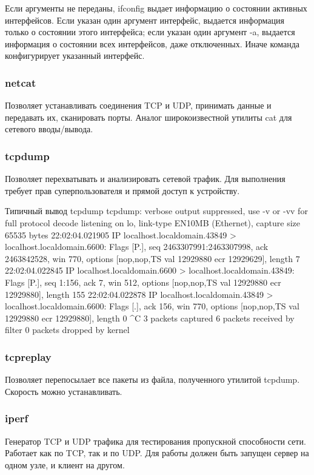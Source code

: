 Если аргументы не переданы, ifconfig выдает информацию о состоянии активных интерфейсов. Если указан один аргумент интерфейс, выдается информация только о состоянии этого интерфейса; если указан один аргумент -a, выдается информация о состоянии всех интерфейсов, даже отключенных. Иначе команда конфигурирует указанный интерфейс.

\subsubsection{netcat}
Позволяет устанавливать соединения TCP и UDP, принимать данные и передавать их, сканировать порты. Аналог широкоизвестной утилиты cat для сетевого вводы/вывода.

\subsubsection{tcpdump}
Позволяет перехватывать и анализировать сетевой трафик. Для выполнения требует прав суперпользователя и прямой доступ к устройству.

\begin{plainlst}{Типичный вывод tcpdump}{}
tcpdump: verbose output suppressed, use -v or -vv for full protocol decode
listening on lo, link-type EN10MB (Ethernet), capture size 65535 bytes
22:02:04.021905 IP localhost.localdomain.43849 > localhost.localdomain.6600: Flags [P.], seq 2463307991:2463307998, ack 2463842528, win 770, options [nop,nop,TS val 12929880 ecr 12929629], length 7
22:02:04.022845 IP localhost.localdomain.6600 > localhost.localdomain.43849: Flags [P.], seq 1:156, ack 7, win 512, options [nop,nop,TS val 12929880 ecr 12929880], length 155
22:02:04.022878 IP localhost.localdomain.43849 > localhost.localdomain.6600: Flags [.], ack 156, win 770, options [nop,nop,TS val 12929880 ecr 12929880], length 0
^C
3 packets captured
6 packets received by filter
0 packets dropped by kernel
\end{plainlst}

\subsubsection{tcpreplay}
Позволяет перепосылает все пакеты из файла, полученного утилитой tcpdump. Скорость можно устанавливать.

\subsubsection{iperf}
Генератор TCP и UDP трафика для тестирования пропускной способности сети. Работает как по TCP, так и по UDP. Для работы должен быть запущен сервер на одном узле, и клиент на другом.

